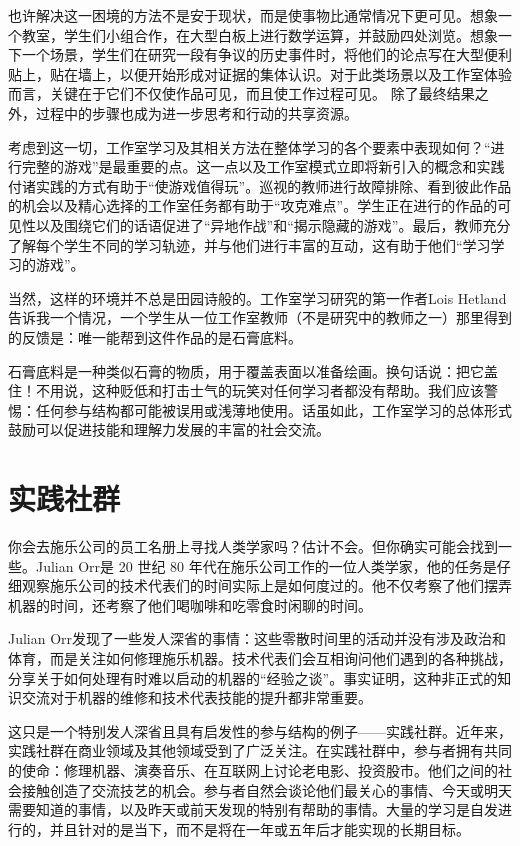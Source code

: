也许解决这一困境的方法不是安于现状，而是使事物比通常情况下更可见。想象一个教室，学生们小组合作，在大型白板上进行数学运算，并鼓励四处浏览。想象一下一个场景，学生们在研究一段有争议的历史事件时，将他们的论点写在大型便利贴上，贴在墙上，以便开始形成对证据的集体认识。对于此类场景以及工作室体验而言，关键在于它们不仅使作品可见，而且使工作过程可见。
除了最终结果之外，过程中的步骤也成为进一步思考和行动的共享资源。

考虑到这一切，工作室学习及其相关方法在整体学习的各个要素中表现如何？“进行完整的游戏”是最重要的点。这一点以及工作室模式立即将新引入的概念和实践付诸实践的方式有助于“使游戏值得玩”。巡视的教师进行故障排除、看到彼此作品的机会以及精心选择的工作室任务都有助于“攻克难点”。学生正在进行的作品的可见性以及围绕它们的话语促进了“异地作战”和“揭示隐藏的游戏”。最后，教师充分了解每个学生不同的学习轨迹，并与他们进行丰富的互动，这有助于他们“学习学习的游戏”。

当然，这样的环境并不总是田园诗般的。工作室学习研究的第一作者Lois Hetland告诉我一个情况，一个学生从一位工作室教师（不是研究中的教师之一）那里得到的反馈是：唯一能帮到这件作品的是石膏底料。

石膏底料是一种类似石膏的物质，用于覆盖表面以准备绘画。换句话说：把它盖住！不用说，这种贬低和打击士气的玩笑对任何学习者都没有帮助。我们应该警惕：任何参与结构都可能被误用或浅薄地使用。话虽如此，工作室学习的总体形式鼓励可以促进技能和理解力发展的丰富的社会交流。

\section*{实践社群}

你会去施乐公司的员工名册上寻找人类学家吗？估计不会。但你确实可能会找到一些。Julian Orr是 20 世纪 80 年代在施乐公司工作的一位人类学家，他的任务是仔细观察施乐公司的技术代表们的时间实际上是如何度过的。他不仅考察了他们摆弄机器的时间，还考察了他们喝咖啡和吃零食时闲聊的时间。

Julian Orr发现了一些发人深省的事情：这些零散时间里的活动并没有涉及政治和体育，而是关注如何修理施乐机器。技术代表们会互相询问他们遇到的各种挑战，分享关于如何处理有时难以启动的机器的“经验之谈”。事实证明，这种非正式的知识交流对于机器的维修和技术代表技能的提升都非常重要。

这只是一个特别发人深省且具有启发性的参与结构的例子——实践社群。近年来，实践社群在商业领域及其他领域受到了广泛关注。在实践社群中，参与者拥有共同的使命：修理机器、演奏音乐、在互联网上讨论老电影、投资股市。他们之间的社会接触创造了交流技艺的机会。参与者自然会谈论他们最关心的事情、今天或明天需要知道的事情，以及昨天或前天发现的特别有帮助的事情。大量的学习是自发进行的，并且针对的是当下，而不是将在一年或五年后才能实现的长期目标。

